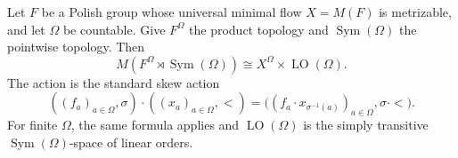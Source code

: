 \begin{theorem}\label{thm:pw-metrizable-fibre-wreath-umf}
Let \(F\) be a Polish group whose universal minimal flow \(X=M(F)\) is
metrizable, and let \(\Omega\) be countable.  Give \(F^\Omega\) the product
topology and \(\operatorname{Sym}(\Omega)\) the pointwise topology.  Then
\[
 M\!\left(F^\Omega\rtimes\operatorname{Sym}(\Omega)\right)
 \cong X^\Omega\times\operatorname{LO}(\Omega).
\]
The action is the standard skew action
\[
 ((f_a)_{a\in\Omega},\sigma)\mathbin{\cdot}((x_a)_{a\in\Omega},<)
 =\bigl((f_a\mathbin{\cdot}x_{\sigma^{-1}(a)})_{a\in\Omega},
        \sigma\mathbin{\cdot}<\bigr).
\]
For finite \(\Omega\), the same formula applies and
\(\operatorname{LO}(\Omega)\) is the simply transitive
\(\operatorname{Sym}(\Omega)\)-space of linear orders.
\end{theorem}

